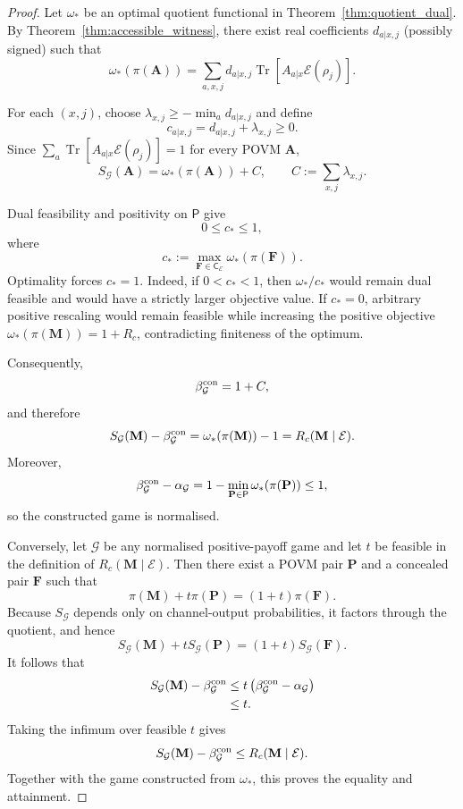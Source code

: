 \documentclass[
aps,pra,twocolumn,10pt,
superscriptaddress,longbibliography,floatfix
]{revtex4-2}
\DeclareMathOperator{\Tr}{Tr}
\begin{document}
\begin{proof}
Let $\omega_*$ be an optimal quotient functional in Theorem~\ref{thm:quotient_dual}. By Theorem~\ref{thm:accessible_witness}, there exist real coefficients $d_{a|x,j}$ (possibly signed) such that
\[
\omega_*(\pi(\mathbf A))
=
\sum_{a,x,j} d_{a|x,j}\Tr[A_{a|x}\mathcal E(\rho_j)].
\]

For each $(x,j)$, choose $\lambda_{x,j}\ge -\min_a d_{a|x,j}$ and define
\[
c_{a|x,j}=d_{a|x,j}+\lambda_{x,j}\ge0.
\]
Since $\sum_a\Tr[A_{a|x}\mathcal E(\rho_j)]=1$ for every POVM $\mathbf A$,
\[
S_{\mathcal G}(\mathbf A)
=
\omega_*(\pi(\mathbf A))
+
C,
\qquad
C:=\sum_{x,j}\lambda_{x,j}.
\]

Dual feasibility and positivity on $\mathsf P$ give
\[
0\le c_*\le1,
\]
where\[
c_*:=
\max_{\mathbf F\in\mathsf C_{\mathcal E}}
\omega_*(\pi(\mathbf F)).
\]
Optimality forces $c_*=1$. Indeed, if $0<c_*<1$,
then $\omega_*/c_*$ would remain dual feasible and would have a
strictly larger objective value. If $c_*=0$, arbitrary positive
rescaling would remain feasible while increasing the positive
objective $\omega_*(\pi(\mathbf M))=1+R_c$, contradicting finiteness
of the optimum.

Consequently,
\[
\beta_{\mathcal G}^{\rm con}=1+C,
\]
and therefore
\[
S_{\mathcal G}(\mathbf M)
-\beta_{\mathcal G}^{\rm con}
=
\omega_*(\pi(\mathbf M))-1
=
R_c(\mathbf M\mid\mathcal E).
\]
Moreover,
\[
\beta_{\mathcal G}^{\rm con}-\alpha_{\mathcal G}
=
1-\min_{\mathbf P\in\mathsf P}
\omega_*(\pi(\mathbf P))
\le1,
\]
so the constructed game is normalised.

Conversely, let $\mathcal G$ be any normalised positive-payoff game
and let $t$ be feasible in the definition of
$R_c(\mathbf M\mid\mathcal E)$. Then there exist a POVM pair
$\mathbf P$ and a concealed pair $\mathbf F$ such that
\[
\pi(\mathbf M)+t\pi(\mathbf P)
=
(1+t)\pi(\mathbf F).
\]
Because $S_{\mathcal G}$ depends only on channel-output
probabilities, it factors through the quotient, and hence
\[
S_{\mathcal G}(\mathbf M)
+tS_{\mathcal G}(\mathbf P)
=
(1+t)S_{\mathcal G}(\mathbf F).
\]
It follows that
\begin{align*}
S_{\mathcal G}(\mathbf M)
-\beta_{\mathcal G}^{\rm con}
&\le
t\left(
\beta_{\mathcal G}^{\rm con}
-\alpha_{\mathcal G}
\right)\\
&\le t.
\end{align*}
Taking the infimum over feasible $t$ gives
\[
S_{\mathcal G}(\mathbf M)
-\beta_{\mathcal G}^{\rm con}
\le
R_c(\mathbf M\mid\mathcal E).
\]
Together with the game constructed from $\omega_*$, this proves
the equality and attainment.
\end{proof}
\end{document}
